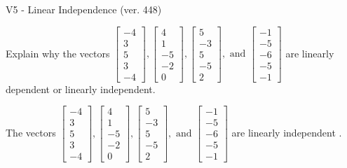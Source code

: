 \begin{exercise}
  \begin{exerciseTitle}V5 - Linear Independence (ver. 448)\end{exerciseTitle}
  \begin{exerciseStatement}
    Explain why the vectors \(\left[\begin{array}{r}
-4 \\
3 \\
5 \\
3 \\
-4
\end{array}\right] , \left[\begin{array}{r}
4 \\
1 \\
-5 \\
-2 \\
0
\end{array}\right] , \left[\begin{array}{r}
5 \\
-3 \\
5 \\
-5 \\
2
\end{array}\right] , \text{ and } \left[\begin{array}{r}
-1 \\
-5 \\
-6 \\
-5 \\
-1
\end{array}\right]\) are linearly dependent or linearly independent.	


  \end{exerciseStatement}
  \begin{exerciseAnswer}
   The vectors \(\left[\begin{array}{r}
-4 \\
3 \\
5 \\
3 \\
-4
\end{array}\right] , \left[\begin{array}{r}
4 \\
1 \\
-5 \\
-2 \\
0
\end{array}\right] , \left[\begin{array}{r}
5 \\
-3 \\
5 \\
-5 \\
2
\end{array}\right] , \text{ and } \left[\begin{array}{r}
-1 \\
-5 \\
-6 \\
-5 \\
-1
\end{array}\right]\) are 
  	 linearly independent  .
  


  \end{exerciseAnswer}
\end{exercise}